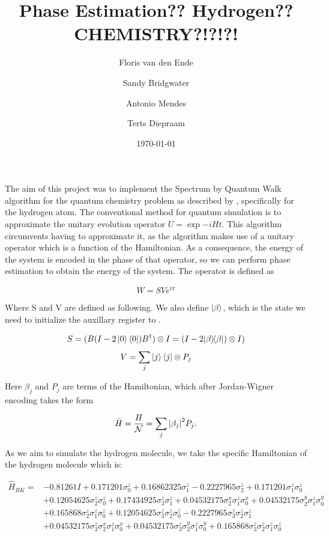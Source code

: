 \documentclass{article}
\title{Phase Estimation?? Hydrogen?? CHEMISTRY?!?!?!}
\author{Floris van den Ende\and Sandy Bridgwater\and Antonio Mendes\and Terts Diepraam}
\date{\today}
\def\kb#1#2{| #1 \rangle\!\langle #2 |}
\begin{document}
\maketitle

The aim of this project was to implement the Spectrum by Quantum Walk algorithm for the quantum chemistry problem as described by \textcite{poulin}, specifically for the hydrogen atom. The conventional method for quantum simulation is to approximate the unitary evolution operator $U = \exp{-iHt}$. This algorithm circumvents having to approximate it, as the algorithm makes use of a unitary operator which is a function of the Hamiltonian. As a consequence, the energy of the system is encoded in the phase of that operator, so we can perform phase estimation to obtain the energy of the system. The operator is defined as

\begin{equation} \label{W}
W = SV e^{i\pi}
\end{equation}

Where S and V are defined as following. We also define $\ket{\beta}$, which is the state we need to initialize the auxillary register to \cite{Poulin}.

\[ S = (B (I - 2 \ket{0}\bra{0}) B^{\dagger}) \otimes I= (I-2\kb \beta \beta) \otimes I) \]
\[ V=\sum_{j}\ket{j}\bra{j} \otimes P_{j} \]

Here $\beta_j$ and $P_j$ are terms of the Hamiltonian, which after Jordan-Wigner encoding takes the form

\begin{equation}
	\bar H = \frac H{\mathcal{N}} = \sum_j\abs{\beta_j}^2 P_j.
\end{equation}

As we aim to simulate the hydrogen molecule, we take the specific Hamiltonian of the hydrogen molecule which is:

\begin{align*}
\hat{H}_{B K}=&-0.81261 I+0.171201 \sigma_{0}^{z}+0.16862325 \sigma_{1}^{z}-0.2227965 \sigma_{2}^{z}+0.171201 \sigma_{1}^{z} \sigma_{0}^{z} \\
&+0.12054625 \sigma_{2}^{z} \sigma_{0}^{z}+0.17434925 \sigma_{3}^{z} \sigma_{1}^{z}+0.04532175 \sigma_{2}^{x} \sigma_{1}^{z} \sigma_{0}^{x}+0.04532175 \sigma_{2}^{y} \sigma_{1}^{z} \sigma_{0}^{y} \\
&+0.165868 \sigma_{2}^{z} \sigma_{1}^{z} \sigma_{0}^{z}+0.12054625 \sigma_{3}^{z} \sigma_{2}^{z} \sigma_{0}^{z}-0.2227965 \sigma_{3}^{z} \sigma_{2}^{z} \sigma_{1}^{z} \\
&+0.04532175 \sigma_{3}^{z} \sigma_{2}^{x} \sigma_{1}^{z} \sigma_{0}^{x}+0.04532175 \sigma_{3}^{z} \sigma_{2}^{y} \sigma_{1}^{z} \sigma_{0}^{y}+0.165868 \sigma_{3}^{z} \sigma_{2}^{z} \sigma_{1}^{z} \sigma_{0}^{z}
\end{align*}
\end{document}
